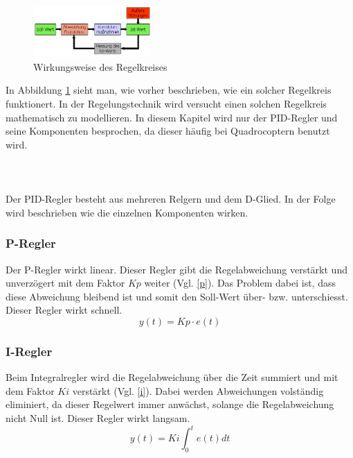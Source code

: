 \documentclass[12pt,a4paper, ngerman]{article}
\begin{document}
\begin{figure}
\centering
\includegraphics[width=0.4\textwidth]{Regelkreis2.png}
\caption[\url{https://rn-wissen.de/wiki/images/5/5d/Regelkreis2.png}]{Wirkungsweise des Regelkreises}\label{regkr2}
\end{figure}
\noindent
In Abbildung \ref{regkr2} sieht man, wie vorher beschrieben, wie ein solcher Regelkreis funktionert. In der Regelungstechnik wird versucht einen solchen Regelkreis mathematisch zu modellieren. In diesem Kapitel wird nur der PID-Regler und seine Komponenten besprochen, da dieser häufig bei Quadrocoptern benutzt wird.\cite{website:rn-wissen_Regelungstechnik}
\\ \\ \\ \\
Der PID-Regler besteht aus mehreren Relgern und dem D-Glied. In der Folge wird beschrieben wie die einzelnen Komponenten wirken. 

\subsubsection{P-Regler}
Der P-Regler wirkt linear. Dieser Regler gibt die Regelabweichung verstärkt und unverzögert mit dem Faktor $Kp$ weiter (Vgl. \ref{p}). Das Problem dabei ist, dass diese Abweichung bleibend ist und somit den Soll-Wert über- bzw. unterschiesst. Dieser Regler wirkt schnell.\cite{website:rn-wissen_Regelungstechnik}
\begin{equation}\label{p}
y(t)=Kp\cdot e(t)
\end{equation}
\newpage
\subsubsection{I-Regler}
Beim Integralregler wird die Regelabweichung über die Zeit summiert und mit dem Faktor $Ki$ verstärkt (Vgl. \ref{i}). Dabei werden Abweichungen volständig eliminiert, da dieser Regelwert immer anwächst, solange die Regelabweichung nicht Null ist. Dieser Regler wirkt langsam.\cite{website:rn-wissen_Regelungstechnik}\\
\begin{equation}\label{i}
y(t)=Ki\int_{0}^{t}e(t)dt
\end{equation}
\end{document}
